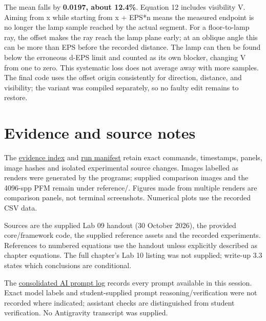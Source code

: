 \documentclass[11pt,a4paper]{article}
\begin{document}
The mean falls by \textbf{0.0197, about 12.4\%}. Equation 12 includes visibility V. Aiming from x while starting from x + EPS*n means the measured endpoint is no longer the lamp sample reached by the actual segment. For a floor-to-lamp ray, the offset makes the ray reach the lamp plane early; at an oblique angle this can be more than EPS before the recorded distance. The lamp can then be found below the erroneous d-EPS limit and counted as its own blocker, changing V from one to zero. This systematic loss does not average away with more samples. The final code uses the offset origin consistently for direction, distance, and visibility; the variant was compiled separately, so no faulty edit remains to restore.


\section{Evidence and source notes}
The \href{https://github.com/Champy2005/Lab09-RayTracing/blob/main/evidence/README.md}{evidence index} and \href{https://github.com/Champy2005/Lab09-RayTracing/blob/main/evidence/data/runs.jsonl}{run manifest} retain exact commands, timestamps, panels, image hashes and isolated experimental source changes. Images labelled as renders were generated by the programs; supplied comparison images and the 4096-spp PFM remain under reference/\allowbreak{}. Figures made from multiple renders are comparison panels, not terminal screenshots. Numerical plots use the recorded CSV data.


Sources are the supplied Lab 09 handout (30 October 2026), the provided core/\allowbreak{}framework code, the supplied reference assets and the recorded experiments. References to numbered equations use the handout unless explicitly described as chapter equations. The full chapter's Lab 10 listing was not supplied; write-up 3.3 states which conclusions are conditional.


The \href{https://github.com/Champy2005/Lab09-RayTracing/blob/main/docs/ai/ai-log.md}{consolidated AI prompt log} records every prompt available in this session. Exact model labels and student-supplied prompt reasoning/\allowbreak{}verification were not recorded where indicated; assistant checks are distinguished from student verification. No Antigravity transcript was supplied.
\end{document}
